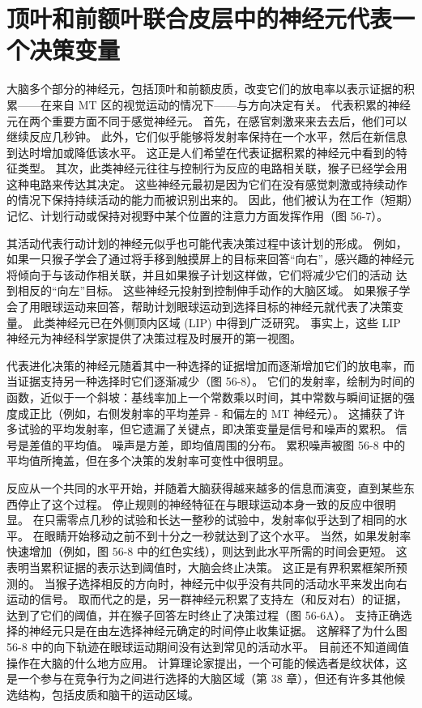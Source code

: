 \section{顶叶和前额叶联合皮层中的神经元代表一个决策变量}
大脑多个部分的神经元，包括顶叶和前额皮质，改变它们的放电率以表示证据的积累——在来自 MT 区的视觉运动的情况下——与方向决定有关。 代表积累的神经元在两个重要方面不同于感觉神经元。 首先，在感官刺激来来去去后，他们可以继续反应几秒钟。 此外，它们似乎能够将发射率保持在一个水平，然后在新信息到达时增加或降低该水平。 这正是人们希望在代表证据积累的神经元中看到的特征类型。 其次，此类神经元往往与控制行为反应的电路相关联，猴子已经学会用这种电路来传达其决定。 这些神经元最初是因为它们在没有感觉刺激或持续动作的情况下保持持续活动的能力而被识别出来的。 因此，他们被认为在工作（短期）记忆、计划行动或保持对视野中某个位置的注意力方面发挥作用（图 56-7）。

其活动代表行动计划的神经元似乎也可能代表决策过程中该计划的形成。 例如，如果一只猴子学会了通过将手移到触摸屏上的目标来回答“向右”，感兴趣的神经元将倾向于与该动作相关联，并且如果猴子计划这样做，它们将减少它们的活动 达到相反的“向左”目标。 这些神经元投射到控制伸手动作的大脑区域。 如果猴子学会了用眼球运动来回答，帮助计划眼球运动到选择目标的神经元就代表了决策变量。 此类神经元已在外侧顶内区域 (LIP) 中得到广泛研究。 事实上，这些 LIP 神经元为神经科学家提供了决策过程及时展开的第一视图。

代表进化决策的神经元随着其中一种选择的证据增加而逐渐增加它们的放电率，而当证据支持另一种选择时它们逐渐减少（图 56-8）。 它们的发射率，绘制为时间的函数，近似于一个斜坡：基线率加上一个常数乘以时间，其中常数与瞬间证据的强度成正比（例如，右侧发射率的平均差异 - 和偏左的 MT 神经元）。 这捕获了许多试验的平均发射率，但它遗漏了关键点，即决策变量是信号和噪声的累积。 信号是差值的平均值。 噪声是方差，即均值周围的分布。 累积噪声被图 56-8 中的平均值所掩盖，但在多个决策的发射率可变性中很明显。

反应从一个共同的水平开始，并随着大脑获得越来越多的信息而演变，直到某些东西停止了这个过程。 停止规则的神经特征在与眼球运动本身一致的反应中很明显。 在只需零点几秒的试验和长达一整秒的试验中，发射率似乎达到了相同的水平。 在眼睛开始移动之前不到十分之一秒就达到了这个水平。 当然，如果发射率快速增加（例如，图 56-8 中的红色实线），则达到此水平所需的时间会更短。 这表明当累积证据的表示达到阈值时，大脑会终止决策。 这正是有界积累框架所预测的。 当猴子选择相反的方向时，神经元中似乎没有共同的活动水平来发出向右运动的信号。 取而代之的是，另一群神经元积累了支持左（和反对右）的证据，达到了它们的阈值，并在猴子回答左时终止了决策过程（图 56-6A）。 支持正确选择的神经元只是在由左选择神经元确定的时间停止收集证据。 这解释了为什么图 56-8 中的向下轨迹在眼球运动期间没有达到常见的活动水平。 目前还不知道阈值操作在大脑的什么地方应用。 计算理论家提出，一个可能的候选者是纹状体，这是一个参与在竞争行为之间进行选择的大脑区域（第 38 章），但还有许多其他候选结构，包括皮质和脑干的运动区域。

